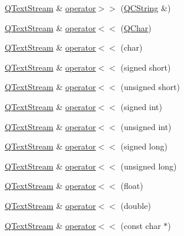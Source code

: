 \begin{DoxyCompactItemize}
\item 
\mbox{\hyperlink{class_q_text_stream}{Q\+Text\+Stream}} \& \mbox{\hyperlink{class_q_text_stream_aea7cbf9e70a47fa15f3091fb26d7263d}{operator$>$$>$}} (\mbox{\hyperlink{class_q_c_string}{Q\+C\+String}} \&)
\item 
\mbox{\hyperlink{class_q_text_stream}{Q\+Text\+Stream}} \& \mbox{\hyperlink{class_q_text_stream_a8382325a2a4bd29dc51bf49d8756fc66}{operator$<$$<$}} (\mbox{\hyperlink{class_q_char}{Q\+Char}})
\item 
\mbox{\hyperlink{class_q_text_stream}{Q\+Text\+Stream}} \& \mbox{\hyperlink{class_q_text_stream_aa4ca816ce1b8a1cb25e3d9dfc1d7c4df}{operator$<$$<$}} (char)
\item 
\mbox{\hyperlink{class_q_text_stream}{Q\+Text\+Stream}} \& \mbox{\hyperlink{class_q_text_stream_a09fa4090716c81548496f5f344c61a61}{operator$<$$<$}} (signed short)
\item 
\mbox{\hyperlink{class_q_text_stream}{Q\+Text\+Stream}} \& \mbox{\hyperlink{class_q_text_stream_a678a728c8ea87eacb59c32f58bf33d9a}{operator$<$$<$}} (unsigned short)
\item 
\mbox{\hyperlink{class_q_text_stream}{Q\+Text\+Stream}} \& \mbox{\hyperlink{class_q_text_stream_af4d8f73d592e7dbf1009381c3795bc0b}{operator$<$$<$}} (signed int)
\item 
\mbox{\hyperlink{class_q_text_stream}{Q\+Text\+Stream}} \& \mbox{\hyperlink{class_q_text_stream_aff4f8bd3513a371838b5ec20be5a5889}{operator$<$$<$}} (unsigned int)
\item 
\mbox{\hyperlink{class_q_text_stream}{Q\+Text\+Stream}} \& \mbox{\hyperlink{class_q_text_stream_a35f51b32c584d1e703e1127c8273510d}{operator$<$$<$}} (signed long)
\item 
\mbox{\hyperlink{class_q_text_stream}{Q\+Text\+Stream}} \& \mbox{\hyperlink{class_q_text_stream_a867f2838d846bc4472ddb5a48f254885}{operator$<$$<$}} (unsigned long)
\item 
\mbox{\hyperlink{class_q_text_stream}{Q\+Text\+Stream}} \& \mbox{\hyperlink{class_q_text_stream_a96b4cb3f67559c1e464f3b03c83a1d67}{operator$<$$<$}} (float)
\item 
\mbox{\hyperlink{class_q_text_stream}{Q\+Text\+Stream}} \& \mbox{\hyperlink{class_q_text_stream_a1e5488fd0334c9fe8200fb1727e3a72e}{operator$<$$<$}} (double)
\item 
\mbox{\hyperlink{class_q_text_stream}{Q\+Text\+Stream}} \& \mbox{\hyperlink{class_q_text_stream_a7c02cd21c226d98bfb1dc18851f500a9}{operator$<$$<$}} (const char $\ast$)
\item 

\end{DoxyCompactItemize}
